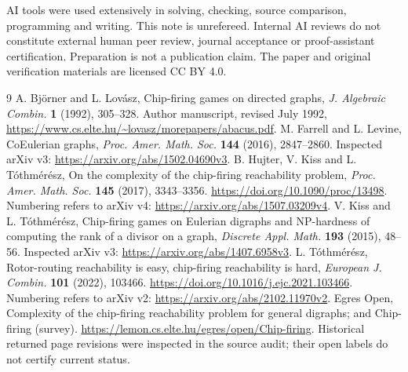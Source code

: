 \documentclass[11pt]{article}
\begin{document}
AI tools were used extensively in solving, checking, source comparison,
programming and writing. This note is unrefereed. Internal AI reviews
do not constitute external human peer review, journal acceptance or
proof-assistant certification. Preparation is not a publication claim.
The paper and original verification materials are licensed CC BY 4.0.

\begin{thebibliography}{9}
 A. Bj\"orner and L. Lov\'asz, Chip-firing games on directed
graphs, \emph{J. Algebraic Combin.} \textbf{1} (1992), 305--328.
Author manuscript, revised July 1992,
\url{https://www.cs.elte.hu/~lovasz/morepapers/abacus.pdf}.
 M. Farrell and L. Levine, CoEulerian graphs,
\emph{Proc. Amer. Math. Soc.} \textbf{144} (2016), 2847--2860.
Inspected arXiv v3: \url{https://arxiv.org/abs/1502.04690v3}.
 B. Hujter, V. Kiss and L. T\'othm\'er\'esz, On the
complexity of the chip-firing reachability problem,
\emph{Proc. Amer. Math. Soc.} \textbf{145} (2017), 3343--3356.
\url{https://doi.org/10.1090/proc/13498}.
Numbering refers to arXiv v4: \url{https://arxiv.org/abs/1507.03209v4}.
 V. Kiss and L. T\'othm\'er\'esz, Chip-firing games on
Eulerian digraphs and NP-hardness of computing the rank of a divisor on
a graph, \emph{Discrete Appl. Math.} \textbf{193} (2015), 48--56.
Inspected arXiv v3: \url{https://arxiv.org/abs/1407.6958v3}.
 L. T\'othm\'er\'esz, Rotor-routing reachability is easy,
chip-firing reachability is hard, \emph{European J. Combin.}
\textbf{101} (2022), 103466.
\url{https://doi.org/10.1016/j.ejc.2021.103466}.
Numbering refers to arXiv v2: \url{https://arxiv.org/abs/2102.11970v2}.
 Egres Open, Complexity of the chip-firing reachability
problem for general digraphs; and Chip-firing (survey).
\url{https://lemon.cs.elte.hu/egres/open/Chip-firing}.
Historical returned page revisions were inspected in the source audit;
their open labels do not certify current status.
\end{thebibliography}
\end{document}
